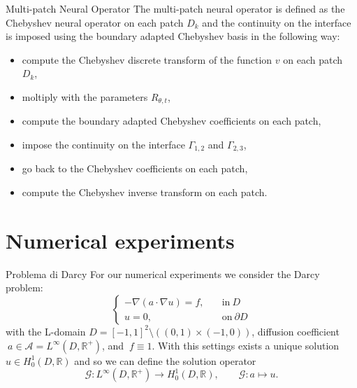 \documentclass{beamer}
\newcommand{\numberset}{\mathbb}
\newcommand{\R}{\numberset{R}}
\begin{document}
\begin{frame}{Multi-patch Neural Operator}
The multi-patch neural operator is defined as the Chebyshev neural operator on each patch $D_k$ and the continuity on the interface is imposed using the boundary adapted Chebyshev basis in the following way:
\begin{itemize}
	\item compute the Chebyshev discrete transform of the function $v$ on each patch $D_k$,
	\item moltiply with the parameters $R_{\theta,t}$,
	\item compute the boundary adapted Chebyshev coefficients on each patch,
	\item impose the continuity on the interface $\Gamma_{1,2}$ and $\Gamma_{2,3}$,
	\item go back to the Chebyshev coefficients on each patch,
	\item compute the Chebyshev inverse transform on each patch.
\end{itemize}

\end{frame}


\section{Numerical experiments}


\begin{frame}{Problema di Darcy}
	For our numerical experiments we consider the Darcy problem:
	\[ 	\begin{cases}
		- \nabla(a \cdot \nabla u) = f,\quad &  \mathrm{in}\ D\\
		u = 0, & \mathrm{on} \ \partial D
	\end{cases} \]
	with the L-domain $ D = [-1, 1]^2\setminus ((0,1)\times (-1,0)) $, diffusion coefficient $\ a \in \mathcal{A} = L^{\infty}(D, \R^+) $,  and $\ f \equiv 1 $. With this settings exists a unique solution $ u \in H^1_0(D, \R) $ and so we can define the solution operator 
	\[  \mathcal{G}: L^{\infty}(D, \R^+) \to H^1_0(D, \R), \qquad \mathcal{G}:a \mapsto u. \]
\end{frame}

\end{document}
